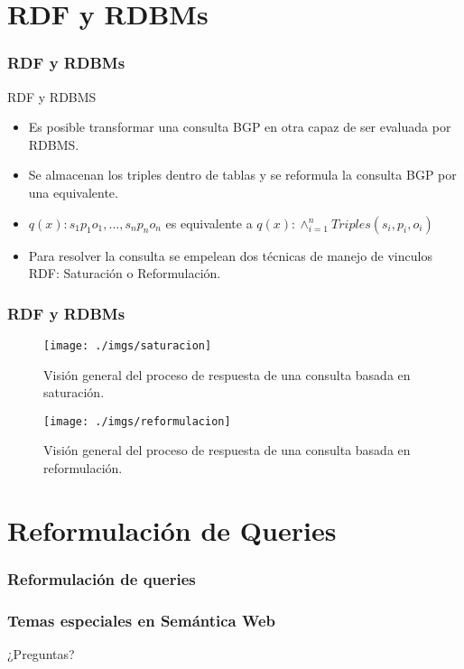 \documentclass{beamer}
\begin{document}
\section{RDF y RDBMs}
\begin{frame}
\frametitle{RDF y RDBMs}
\begin{block}{RDF y RDBMS}
\begin{itemize}
\item{Es posible transformar una consulta BGP en otra capaz de ser evaluada por RDBMS.}
\item{Se almacenan los triples dentro de tablas y se reformula la consulta BGP por una equivalente.}
\item{$q(x) : s_{1} p_{1} o_{1}, ..., s_{n} p_{n} o_{n}$ es equivalente a $q(x): \wedge ^n _{i = 1} Triples(s_{i}, p_{i}, o_{i})$}
\item{Para resolver la consulta se empelean dos técnicas de manejo de vinculos RDF: Saturación o Reformulación.}
\end{itemize}
\end{block}
\end{frame}

\begin{frame}
\frametitle{RDF y RDBMs}

\begin{figure}[h]
\begin{center}
\texttt{[image: ./imgs/saturacion]}
\caption{Visión general del proceso de respuesta de una consulta basada en saturación.}
\end{center}
\end{figure}

\begin{figure}[H]
\begin{center}
\texttt{[image: ./imgs/reformulacion]}
\caption{Visión general del proceso de respuesta de una consulta basada en reformulación.}
\end{center}
\end{figure}
\end{frame}

\section{Reformulación de Queries}
\begin{frame}
\frametitle{Reformulación de queries}

\end{frame}
\begin{frame}
\frametitle{Temas especiales en Semántica Web}

\end{frame}

\begin{frame}
\Huge{\centerline{¿Preguntas?}}
\end{frame}

\end{document}
